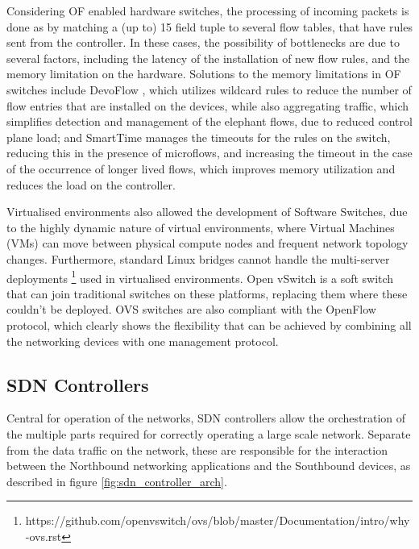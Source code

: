 \begin {enumerate}
\begin{enumerate}
\par Considering OF enabled hardware switches, the processing of incoming packets is done as by matching a (up to) 15 field tuple \cite {CITE - flow_table_management_sdn_switches} to several flow tables, 
that have rules sent from the controller. In these cases, the possibility of bottlenecks are due to several factors, including the latency of the installation of new flow rules, and the memory limitation on the hardware. Solutions 
to the memory limitations in OF switches include DevoFlow \cite {CITE - https://hal.inria.fr/hal-00825087/document}, which utilizes wildcard rules to reduce the number of flow entries that are installed on the devices, while also
aggregating traffic, which simplifies detection and management of the elephant flows, due to reduced control plane load; and SmartTime \cite {CITE - http://rishabhpoddar.com/publications/SmartTime.pdf} manages the timeouts
for the rules on the switch, reducing this in the presence of microflows, and increasing the timeout in the case of the occurrence of longer lived flows, which improves memory utilization and reduces the load on the controller.

\par Virtualised environments also allowed the development of Software Switches, due to the highly dynamic nature of virtual environments, where Virtual Machines (VMs) can move between physical compute nodes and frequent
network topology changes. Furthermore, standard Linux bridges cannot handle the multi-server deployments \footnote {https://github.com/openvswitch/ovs/blob/master/Documentation/intro/why-ovs.rst} used in virtualised environments. 
Open vSwitch is a soft switch that can join traditional switches on these platforms, replacing them where these couldn't be deployed. OVS switches are also compliant with the OpenFlow protocol, which clearly shows the flexibility
that can be achieved by combining all the networking devices with one management protocol. 

\subsection {SDN Controllers}

Central for operation of the networks, SDN controllers allow the orchestration of the multiple parts required for correctly operating a large scale network. Separate from the data traffic on the network, these are responsible for the interaction
between the Northbound networking applications and the Southbound devices, as described in figure \ref{fig:sdn_controller_arch}. 


\end{enumerate}
\end{enumerate}
